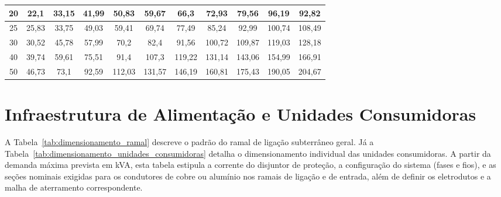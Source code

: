 \documentclass[12pt,openright,oneside,a4paper,brazil]{abntex2}
\begin{document}
\begin{table}[H]
\begin{sideways}
\begin{minipage}{\textwidth}
{\begin{tabular}{c|c|c|c|c|c|c|c|c|c|c}
        20 & 22,1 & 33,15 & 41,99 & 50,83 & 59,67 & 66,3 & 72,93 & 79,56 & 96,19 & 92,82 \\ \hline
        25 & 25,83 & 33,75 & 49,03 & 59,41 & 69,74 & 77,49 & 85,24 & 92,99 & 100,74 & 108,49 \\ \hline
        30 & 30,52 & 45,78 & 57,99 & 70,2 & 82,4 & 91,56 & 100,72 & 109,87 & 119,03 & 128,18 \\ \hline
        40 & 39,74 & 59,61 & 75,51 & 91,4 & 107,3 & 119,22 & 131,14 & 143,06 & 154,99 & 166,91 \\ \hline
        50 & 46,73 & 73,1 & 92,59 & 112,03 & 131,57 & 146,19 & 160,81 & 175,43 & 190,05 & 204,67 \\ 
        \hline
        \end{tabular}%
        }
        
        \vspace{0.15cm}
    \end{minipage}
\end{sideways}

\end{table}


\section{Infraestrutura de Alimentação e Unidades Consumidoras}

\hspace{1.27cm}A Tabela~\ref{tab:dimensionamento_ramal} descreve o padrão do ramal de ligação subterrâneo geral. Já a Tabela~\ref{tab:dimensionamento_unidades_consumidoras} detalha o dimensionamento individual das unidades consumidoras. A partir da demanda máxima prevista em kVA, esta tabela estipula a corrente do disjuntor de proteção, a configuração do sistema (fases e fios), e as seções nominais exigidas para os condutores de cobre ou alumínio nos ramais de ligação e de entrada, além de definir os eletrodutos e a malha de aterramento correspondente.
\end{document}
